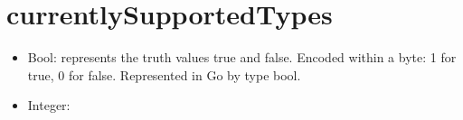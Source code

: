 \section{currentlySupportedTypes}

\begin{itemize}
	\item Bool: represents the truth values true and false. Encoded within a byte: 1 for true, 0 for false. Represented in Go by type bool.
	\item Integer: 
\end{itemize}
